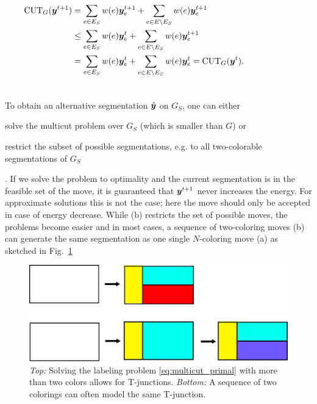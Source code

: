 \begin{align*}
\CUT_G(\y^{t+1})
&=
\sum_{e\in E_S}            \w(e) \y_e^{t+1} +
\sum_{e\in E\setminus E_S} \w(e) \y_e^{t+1}
\\
&\leq
%
\sum_{e\in E_S}            \w(e) \y_e^t +
\sum_{e\in E\setminus E_S} \w(e) \y_e^{t+1}\\
%
&=
%
\sum_{e\in E_S}            \w(e) \y_e^t +
\sum_{e\in E\setminus E_S} \w(e) \y_e^t 
%
=
%
\CUT_G(\y^t).\\
&\hspace*{0.75\columnwidth}
\end{align*}



To obtain an alternative segmentation $\hat{\boldsymbol y}$ on $G_S$, one can either
\begin{inparaenum}[(a)]
\item solve the multicut problem over $G_S$ (which is smaller than $G$)
or
\item restrict the subset of possible segmentations,
      e.g. to all two-colorable segmentations of $G_S$%
\end{inparaenum}.
If we solve the problem to optimality and the current segmentation is in
the feasible set of the move,
it is guaranteed that $\boldsymbol y^{t+1}$ never increases the
energy.
%
For approximate solutions this is not the case; here the move should only be
accepted in case of energy decrease.
%
While (b) restricts the set of possible moves, the problems become easier
and in most cases, a sequence of two-coloring moves (b)
can generate the same segmentation as one single $N$-coloring move (a)
as sketched in Fig.~\ref{fig:illustrate_t}

\begin{figure}[b]
\centering\includegraphics[width=0.8\columnwidth]{fig/tjunction.pdf}
%
\caption[Solving the labeling problem with more than two colors allows for T-junctions ]{%
\emph{Top:} Solving the labeling problem \eqref{eq:multicut_primal} with
more than two colors allows for T-junctions.
%
\emph{Bottom:} A sequence of two colorings can often model the same
T-junction. 
\label{fig:illustrate_t}}
\end{figure}





